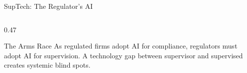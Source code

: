 \begin{frame}{SupTech: The Regulator's AI}
\begin{columns}[T]
\begin{column}{0.47\textwidth}
      \vspace{0.3em}
      \begin{alertblock}{The Arms Race}
        As regulated firms adopt AI for compliance, regulators must adopt AI
        for supervision. \textcolor{mlred}{A technology gap between supervisor
        and supervised creates systemic blind spots.}
      \end{alertblock}
    \end{column}
  \end{columns}
\end{frame}


